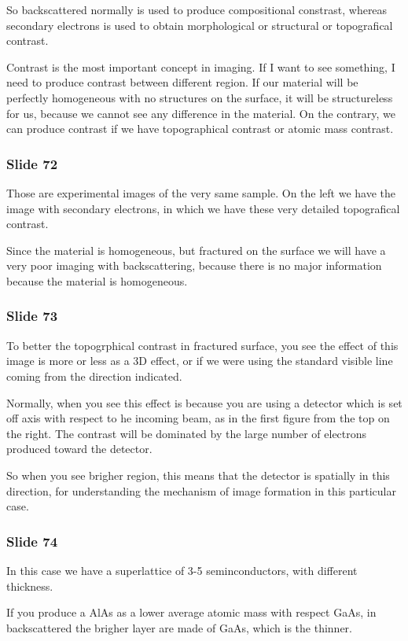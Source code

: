 \documentclass[../main/main.tex]{subfiles}
\begin{document}
So backscattered normally is used to produce compositional constrast, whereas secondary electrons is used to obtain morphological or structural or topografical contrast.

Contrast is the most important concept in imaging. If I want to see something, I need to produce contrast between different region. If our material will be perfectly homogeneous with no structures on the surface, it will be structureless for us, because we cannot see any difference in the material. On the contrary, we can produce contrast if we have topographical contrast or atomic mass contrast.

\subsubsection{Slide 72}
Those are experimental images of the very same sample. On the left we have the image with secondary electrons, in which we have these very detailed topografical contrast.

Since the material is homogeneous, but fractured on the surface we will have a very poor imaging with backscattering, because there is no major information because the material is homogeneous.

\subsubsection{Slide 73}
To better the topogrphical contrast in fractured surface, you see the effect of this image is more or less as a 3D effect, or if we were using the standard visible line coming from the direction indicated.

Normally, when you see this effect is because you are using a detector which is set off axis with respect to he incoming beam, as in the first figure from the top on the right.
The contrast will be dominated by the large number of electrons produced toward the detector.

So when you see brigher region, this means that the detector is spatially in this direction, for understanding the mechanism of image formation in this particular case.


\subsubsection{Slide 74}
In this case we have a superlattice of 3-5 seminconductors, with different thickness.

If you produce a AlAs as a lower average atomic mass with respect GaAs, in backscattered the brigher layer are made of GaAs, which is the thinner.
\end{document}
